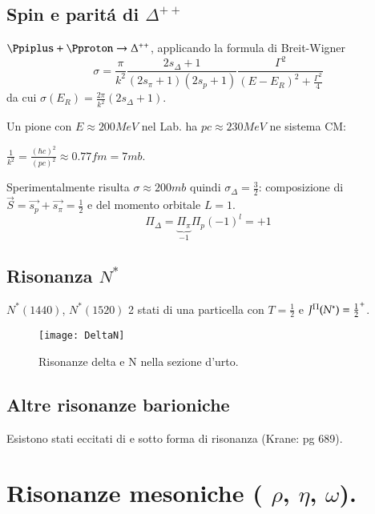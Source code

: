 \documentclass[main.tex]{subfiles}
\begin{document}

\clearpage

\subsection{Spin e parit\'a di $\Delta^{++}$}

$\Ppiplus+\Pproton\rightarrow \Delta^{++}$, applicando la formula di Breit-Wigner\\
\begin{equation*}
\sigma=\frac{\pi}{k^2}\frac{2s_{\Delta}+1}{(2s_{\pi}+1)(2s_p+1)}\frac{\Gamma^2}{(E-E_R)^2+\frac{\Gamma^2}{4}}
\end{equation*}
da cui $\sigma(E_R)=\frac{2\pi}{k^2}(2s_{\Delta}+1)$.

Un pione con $E\approx 200MeV$ nel Lab. ha $pc\approx 230 MeV$ ne sistema CM:

$\frac{1}{k^2}=\frac{(\hbar c)^2}{(pc)^2}\approx 0.77 fm=7 mb$.

Sperimentalmente risulta $\sigma\approx200mb$ quindi $\sigma_{\Delta}=\frac{3}{2}$: composizione di $\vec{S}=\vec{s_p}+\vec{s_{\pi}}=\frac{1}{2}$ e del momento orbitale $L=1$.\\

\begin{equation*}
\Pi_{\Delta}=\underbrace{\Pi_{\pi}}_{-1}\Pi_{p}(-1)^l=+1
\end{equation*}


\subsection{Risonanza $N^*$}
$N^*(1440)$, $N^*(1520)$ 2 stati di una particella con $T=\frac{1}{2}$ e $J^{\Pi}(N^*)=\frac{1}{2}^+$.

\begin{figure}[!ht]
\centering
\texttt{[image: DeltaN]}
\caption{Risonanze delta e N nella sezione d'urto.}
\label{fig:DeltaN}
\end{figure}

\clearpage

\subsection{Altre risonanze barioniche}
Esistono stati eccitati di \PSigma e \PXi sotto forma di risonanza (Krane: pg 689).

\section{Risonanze mesoniche ( $\rho$, $\eta$, $\omega$).}
\end{document}
